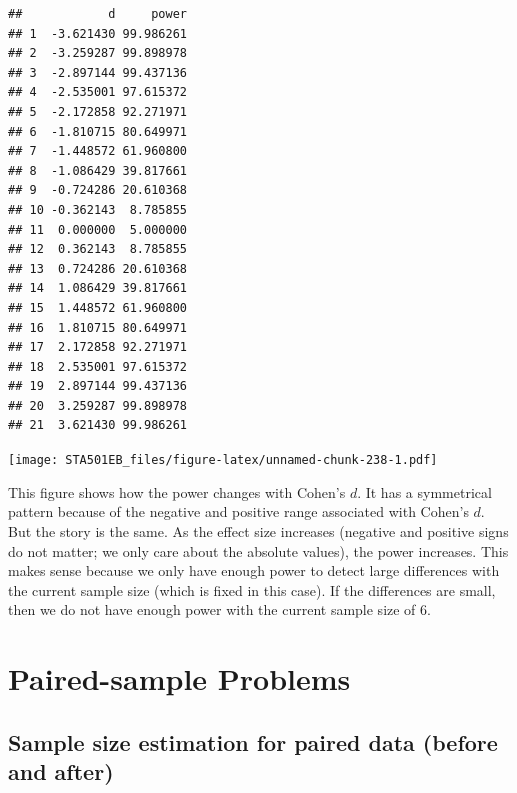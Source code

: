 \documentclass[
]{book}
\newenvironment{Shaded}{\begin{snugshade}}{\end{snugshade}}
\newcommand{\AttributeTok}[1]{\textcolor[rgb]{0.13,0.29,0.53}{#1}}
\newcommand{\FunctionTok}[1]{\textcolor[rgb]{0.13,0.29,0.53}{\textbf{#1}}}
\newcommand{\NormalTok}[1]{#1}
\newcommand{\SpecialCharTok}[1]{\textcolor[rgb]{0.81,0.36,0.00}{\textbf{#1}}}
\newcommand{\StringTok}[1]{\textcolor[rgb]{0.31,0.60,0.02}{#1}}
\begin{document}
\begin{verbatim}
##            d     power
## 1  -3.621430 99.986261
## 2  -3.259287 99.898978
## 3  -2.897144 99.437136
## 4  -2.535001 97.615372
## 5  -2.172858 92.271971
## 6  -1.810715 80.649971
## 7  -1.448572 61.960800
## 8  -1.086429 39.817661
## 9  -0.724286 20.610368
## 10 -0.362143  8.785855
## 11  0.000000  5.000000
## 12  0.362143  8.785855
## 13  0.724286 20.610368
## 14  1.086429 39.817661
## 15  1.448572 61.960800
## 16  1.810715 80.649971
## 17  2.172858 92.271971
## 18  2.535001 97.615372
## 19  2.897144 99.437136
## 20  3.259287 99.898978
## 21  3.621430 99.986261
\end{verbatim}

\begin{Shaded}
\end{Shaded}

\texttt{[image: STA501EB\_files/figure-latex/unnamed-chunk-238-1.pdf]}

This figure shows how the power changes with Cohen's \(d\). It has a symmetrical pattern because of the negative and positive range associated with Cohen's \(d\). But the story is the same. As the effect size increases (negative and positive signs do not matter; we only care about the absolute values), the power increases. This makes sense because we only have enough power to detect large differences with the current sample size (which is fixed in this case). If the differences are small, then we do not have enough power with the current sample size of 6.

\hypertarget{paired-sample-problems}{%
\section{Paired-sample Problems}\label{paired-sample-problems}}

\hypertarget{sample-size-estimation-for-paired-data-before-and-after}{%
\subsection{\texorpdfstring{Sample size estimation for \textbf{paired data (before and after)}}{Sample size estimation for paired data (before and after)}}\label{sample-size-estimation-for-paired-data-before-and-after}}
\end{document}
